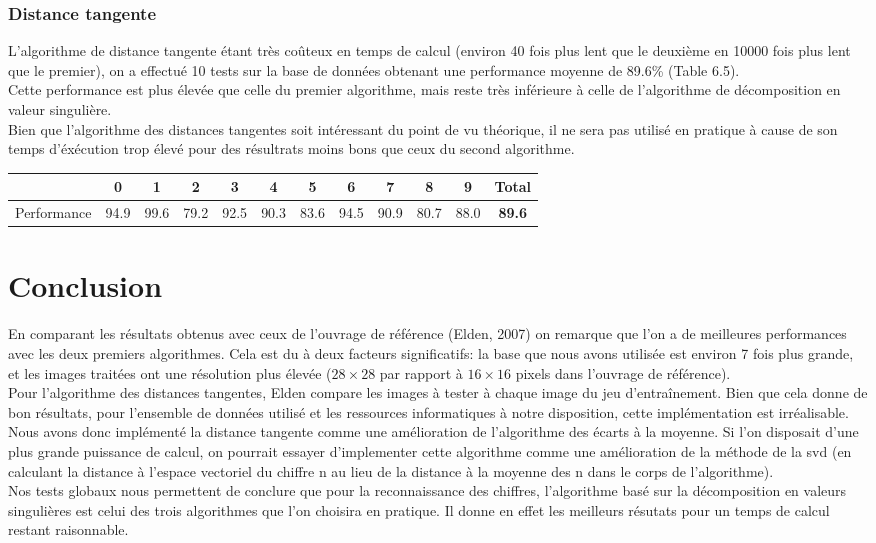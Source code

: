 \documentclass[a4paper,11pt,twoside]{report}
\begin{document}
\subsection{Distance tangente}
L’algorithme de distance tangente étant très coûteux en temps de calcul (environ 40 fois plus lent que le deuxième en 10000 fois plus lent que le premier), on a effectué 10 tests sur la base de données obtenant une performance moyenne de 89.6\% (Table 6.5).\\
Cette performance est plus élevée que celle du premier algorithme, mais reste très inférieure à celle de l'algorithme de décomposition en valeur singulière.\\ Bien que l'algorithme des distances tangentes soit intéressant du point de vu théorique, il ne sera pas utilisé en pratique à cause de son temps d'éxécution trop élevé pour des résultrats moins bons que ceux du second algorithme.

\begin{center}
\begin{tabular}{ |c||c|c|c|c|c|c|c|c|c|c|c| } 
 \hline
   & 0 & 1 & 2 & 3 & 4 & 5 & 6 & 7 & 8 & 9 & \textbf{Total} \\ 
  \hline
  \hline
 Performance & 94.9 & 99.6 & 79.2 & 92.5 & 90.3 & 83.6 & 94.5 & 90.9 & 80.7 & 88.0 &  \textbf{89.6} \\

 \hline
\end{tabular}
\end{center}


\chapter{Conclusion}
En comparant les résultats obtenus avec ceux de l'ouvrage de référence (Elden, 2007) on remarque que l'on a de meilleures performances avec les deux premiers algorithmes. Cela est du à deux facteurs significatifs: la base que nous avons utilisée est environ 7 fois plus grande, et les images traitées ont une résolution plus élevée ($28\times 28$ par rapport à $16\times 16$ pixels dans l'ouvrage de référence).\\
Pour l'algorithme des distances tangentes, Elden compare les images à tester à chaque image du jeu d'entraînement. Bien que cela donne de bon résultats, pour l'ensemble de données utilisé et les ressources informatiques à notre disposition, cette implémentation est irréalisable. Nous avons donc implémenté la distance tangente comme une amélioration de l'algorithme des écarts à la moyenne. Si l'on disposait d'une plus grande puissance de calcul, on pourrait essayer d'implementer cette algorithme comme une amélioration de la méthode de la svd (en calculant la distance à l'espace vectoriel du chiffre n au lieu de la distance à la moyenne des n dans le corps de l'algorithme).\\
Nos tests globaux nous permettent de conclure que pour la reconnaissance des chiffres, l'algorithme basé sur la décomposition en valeurs singulières est celui des trois algorithmes que l'on choisira en pratique. Il donne en effet les meilleurs résutats pour un temps de calcul restant raisonnable.



\end{document}
